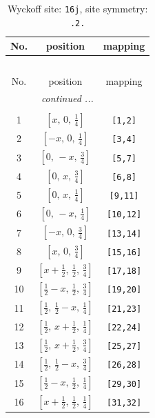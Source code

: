 \documentclass[fleqn,8pt]{jsarticle}
\begin{document}
\renewcommand{\arraystretch}{1.2}
\begin{longtable}{ccc}
\caption{Wyckoff site: {\tt 16j}, site symmetry: {\tt .2.}}
 \\
 \hline \hline
No. & position & mapping \\ \hline \endfirsthead

\multicolumn{2}{l}{\tablename\ \thetable{}} \\
 \hline \hline
No. & position & mapping \\ \hline \endhead

 \hline \hline
\multicolumn{2}{r}{\footnotesize\it continued ...} \\ \endfoot

 \hline \hline
\multicolumn{2}{r}{} \\ \endlastfoot

1 & $\left[ x,\, 0,\, \frac{1}{4} \right]$ & {\tt [1,2]} \\ \hline
2 & $\left[ - x,\, 0,\, \frac{1}{4} \right]$ & {\tt [3,4]} \\ \hline
3 & $\left[ 0,\, - x,\, \frac{3}{4} \right]$ & {\tt [5,7]} \\ \hline
4 & $\left[ 0,\, x,\, \frac{3}{4} \right]$ & {\tt [6,8]} \\ \hline
5 & $\left[ 0,\, x,\, \frac{1}{4} \right]$ & {\tt [9,11]} \\ \hline
6 & $\left[ 0,\, - x,\, \frac{1}{4} \right]$ & {\tt [10,12]} \\ \hline
7 & $\left[ - x,\, 0,\, \frac{3}{4} \right]$ & {\tt [13,14]} \\ \hline
8 & $\left[ x,\, 0,\, \frac{3}{4} \right]$ & {\tt [15,16]} \\ \hline
9 & $\left[ x + \frac{1}{2},\, \frac{1}{2},\, \frac{3}{4} \right]$ & {\tt [17,18]} \\ \hline
10 & $\left[ \frac{1}{2} - x,\, \frac{1}{2},\, \frac{3}{4} \right]$ & {\tt [19,20]} \\ \hline
11 & $\left[ \frac{1}{2},\, \frac{1}{2} - x,\, \frac{1}{4} \right]$ & {\tt [21,23]} \\ \hline
12 & $\left[ \frac{1}{2},\, x + \frac{1}{2},\, \frac{1}{4} \right]$ & {\tt [22,24]} \\ \hline
13 & $\left[ \frac{1}{2},\, x + \frac{1}{2},\, \frac{3}{4} \right]$ & {\tt [25,27]} \\ \hline
14 & $\left[ \frac{1}{2},\, \frac{1}{2} - x,\, \frac{3}{4} \right]$ & {\tt [26,28]} \\ \hline
15 & $\left[ \frac{1}{2} - x,\, \frac{1}{2},\, \frac{1}{4} \right]$ & {\tt [29,30]} \\ \hline
16 & $\left[ x + \frac{1}{2},\, \frac{1}{2},\, \frac{1}{4} \right]$ & {\tt [31,32]} \\
\end{longtable}
\end{document}
